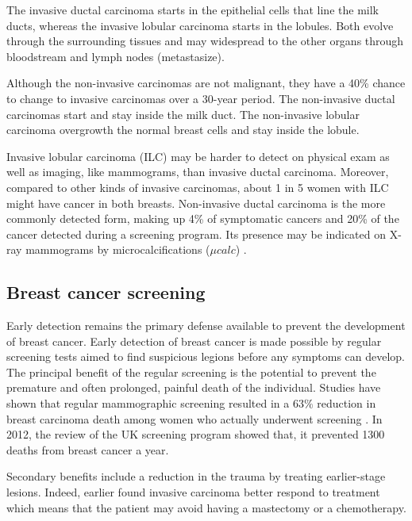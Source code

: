 The invasive ductal carcinoma starts in the epithelial cells that line the milk ducts, whereas the invasive lobular carcinoma starts in the lobules. Both evolve through the surrounding tissues and may widespread to the other organs through bloodstream and lymph nodes (metastasize). 

Although the non-invasive carcinomas are not malignant, they have a 40\% chance to change to invasive carcinomas over a 30-year period. The non-invasive ductal carcinomas start and stay inside the milk duct. The non-invasive lobular carcinoma overgrowth the normal breast cells and stay inside the lobule. 

Invasive lobular carcinoma (ILC)  may be harder to detect on physical exam as well as imaging, like mammograms, than invasive ductal carcinoma. Moreover, compared to other kinds of invasive carcinomas, about 1 in 5 women with ILC might have cancer in both breasts.  Non-invasive ductal carcinoma is the more commonly detected form, making up 4\% of symptomatic cancers and 20\% of the cancer detected during a screening program. Its presence may be indicated on X-ray mammograms by microcalcifications ($\mu calc$) \citep{acs_cancer_2017}.
 
\subsection{Breast cancer screening}\label{subsection:cancerscrenning}
Early detection remains the primary defense available to prevent the development of breast cancer. Early detection of breast cancer is made possible by  regular screening tests aimed to find suspicious legions before any symptoms can develop.  The principal benefit of the regular screening is the potential to prevent the premature and often prolonged, painful death of the individual. Studies have shown that regular mammographic screening resulted in a $63\%$ reduction in breast carcinoma death among women who actually underwent screening \citep{tabar_beyond_2001}. In 2012, the review of the UK screening program \citep{NHSBSP_2012} showed that, it prevented 1300 deaths from breast cancer a year. 

Secondary benefits include a reduction in the trauma by treating earlier-stage lesions. Indeed, earlier found invasive carcinoma better respond  to treatment which means that the patient may avoid having a mastectomy or a chemotherapy.

